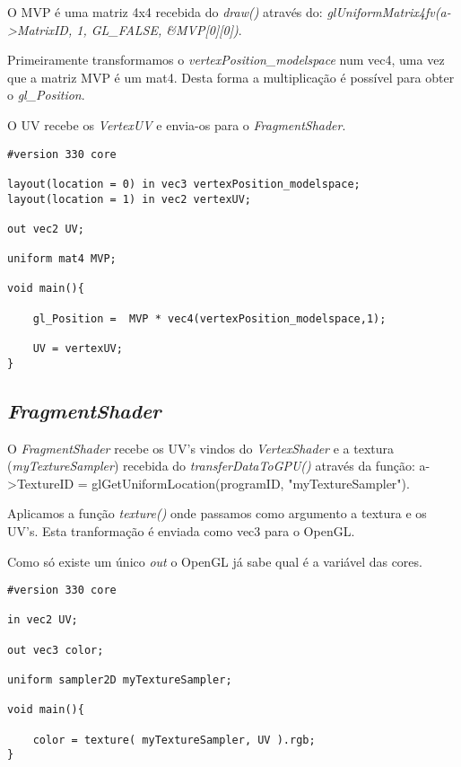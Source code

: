 O MVP é uma matriz 4x4 recebida do \textit{draw()} através do: \newline \textit{glUniformMatrix4fv(a->MatrixID, 1, GL\_FALSE, \&MVP[0][0])}. 

Primeiramente transformamos o \textit{vertexPosition\_modelspace} num vec4, uma vez que a matriz MVP é um mat4. Desta forma a multiplicação é possível para obter o \textit{gl\_Position}.

O UV recebe os \textit{VertexUV} e envia-os para o \textit{FragmentShader}.

\begin{lstlisting}[caption=\textit{VertexShader}]
#version 330 core

layout(location = 0) in vec3 vertexPosition_modelspace;
layout(location = 1) in vec2 vertexUV;

out vec2 UV;

uniform mat4 MVP;

void main(){

	gl_Position =  MVP * vec4(vertexPosition_modelspace,1);
	
	UV = vertexUV;
}
\end{lstlisting}

\subsection{\textit{FragmentShader}}
O \textit{FragmentShader} recebe os UV's vindos do \textit{VertexShader} e a textura (\textit{myTextureSampler}) recebida do \textit{transferDataToGPU()} através da função:\newline
a->TextureID = glGetUniformLocation(programID, "myTextureSampler").

Aplicamos a função \textit{texture()} onde passamos como argumento a textura e os UV's. Esta tranformação é enviada como vec3 para o OpenGL.

Como só existe um único \textit{out} o OpenGL já sabe qual é a variável das cores.

\begin{lstlisting}[caption=\textit{FragmentShader}]
#version 330 core

in vec2 UV;

out vec3 color;

uniform sampler2D myTextureSampler;

void main(){

	color = texture( myTextureSampler, UV ).rgb;
}
\end{lstlisting}




